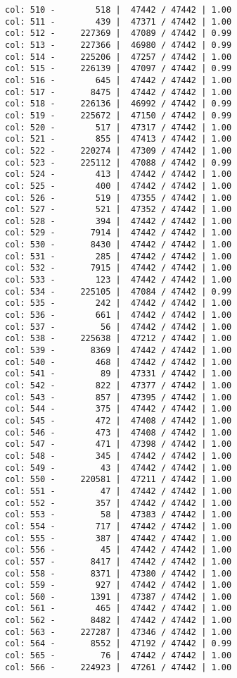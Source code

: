 \documentclass[11pt]{article}
\begin{document}
\begin{Verbatim}[commandchars=\\\{\}]
col: 510 -        518 |  47442 / 47442 | 1.00
col: 511 -        439 |  47371 / 47442 | 1.00
col: 512 -     227369 |  47089 / 47442 | 0.99
col: 513 -     227366 |  46980 / 47442 | 0.99
col: 514 -     225206 |  47257 / 47442 | 1.00
col: 515 -     226139 |  47097 / 47442 | 0.99
col: 516 -        645 |  47442 / 47442 | 1.00
col: 517 -       8475 |  47442 / 47442 | 1.00
col: 518 -     226136 |  46992 / 47442 | 0.99
col: 519 -     225672 |  47150 / 47442 | 0.99
col: 520 -        517 |  47317 / 47442 | 1.00
col: 521 -        855 |  47413 / 47442 | 1.00
col: 522 -     220274 |  47309 / 47442 | 1.00
col: 523 -     225112 |  47088 / 47442 | 0.99
col: 524 -        413 |  47442 / 47442 | 1.00
col: 525 -        400 |  47442 / 47442 | 1.00
col: 526 -        519 |  47355 / 47442 | 1.00
col: 527 -        521 |  47352 / 47442 | 1.00
col: 528 -        394 |  47442 / 47442 | 1.00
col: 529 -       7914 |  47442 / 47442 | 1.00
col: 530 -       8430 |  47442 / 47442 | 1.00
col: 531 -        285 |  47442 / 47442 | 1.00
col: 532 -       7915 |  47442 / 47442 | 1.00
col: 533 -        123 |  47442 / 47442 | 1.00
col: 534 -     225105 |  47084 / 47442 | 0.99
col: 535 -        242 |  47442 / 47442 | 1.00
col: 536 -        661 |  47442 / 47442 | 1.00
col: 537 -         56 |  47442 / 47442 | 1.00
col: 538 -     225638 |  47212 / 47442 | 1.00
col: 539 -       8369 |  47442 / 47442 | 1.00
col: 540 -        468 |  47442 / 47442 | 1.00
col: 541 -         89 |  47331 / 47442 | 1.00
col: 542 -        822 |  47377 / 47442 | 1.00
col: 543 -        857 |  47395 / 47442 | 1.00
col: 544 -        375 |  47442 / 47442 | 1.00
col: 545 -        472 |  47408 / 47442 | 1.00
col: 546 -        473 |  47408 / 47442 | 1.00
col: 547 -        471 |  47398 / 47442 | 1.00
col: 548 -        345 |  47442 / 47442 | 1.00
col: 549 -         43 |  47442 / 47442 | 1.00
col: 550 -     220581 |  47211 / 47442 | 1.00
col: 551 -         47 |  47442 / 47442 | 1.00
col: 552 -        357 |  47442 / 47442 | 1.00
col: 553 -         58 |  47383 / 47442 | 1.00
col: 554 -        717 |  47442 / 47442 | 1.00
col: 555 -        387 |  47442 / 47442 | 1.00
col: 556 -         45 |  47442 / 47442 | 1.00
col: 557 -       8417 |  47442 / 47442 | 1.00
col: 558 -       8371 |  47380 / 47442 | 1.00
col: 559 -        927 |  47442 / 47442 | 1.00
col: 560 -       1391 |  47387 / 47442 | 1.00
col: 561 -        465 |  47442 / 47442 | 1.00
col: 562 -       8482 |  47442 / 47442 | 1.00
col: 563 -     227287 |  47346 / 47442 | 1.00
col: 564 -       8552 |  47192 / 47442 | 0.99
col: 565 -         76 |  47442 / 47442 | 1.00
col: 566 -     224923 |  47261 / 47442 | 1.00

\end{Verbatim}
\end{document}
